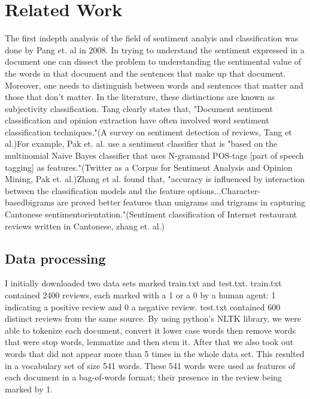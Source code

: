 \documentclass{article} %
\begin{document}
\section{Related Work}
The first indepth analysis of the field of sentiment analyis and classification was done by Pang et. al in 2008.\cite{Pang2008} In trying to understand the sentiment expressed in a document one can dissect the problem to understanding the sentimental value of the words in that document and the sentences that make up that document. Moreover, one needs to distinguish between words and sentences that matter and those that don't matter. In the literature, these distinctions are known as subjectivity classification.\cite{Tang2009} Tang clearly states that, "Document sentiment classification and opinion extraction have often involved word sentiment classification techniques."\cite{Tang2009}(A survey on sentiment detection of reviews, Tang et al.)For example, Pak et. al. use a sentiment classifier that is "based on the multinomial Naive Bayes classifier that uses N-gramand POS-tags [part of speech tagging] as features."\cite{Pak2010}(Twitter as a Corpus for Sentiment Analysis and Opinion Mining, Pak et. al.)Zhang et al. found that, "accuracy is influenced by interaction between the classification models and the feature options...Character-basedbigrams are proved better features than unigrams and trigrams in capturing Cantonese sentimentorientation."\cite{Zhang2011}(Sentiment classification of Internet restaurant reviews written in Cantonese, zhang et. al.)

\subsection{Data processing}
I initially downloaded two data sets marked train.txt and test.txt. train.txt contained 2400 reviews, each marked with a 1 or a 0 by a human agent: 1 indicating a positive review and 0 a negative review. test.txt contained 600 distinct reviews from the same source. By using python's NLTK library, we were able to tokenize each document, convert it lower case words then remove words that were stop words, lemmatize and then stem it. After that we also took out words that did not appear more than 5 times in the whole data set. This resulted in a vocabulary set of size 541 words.  These 541 words were used as features of each document in a bag-of-words format; their presence in the review being marked by 1. 
\end{document}
